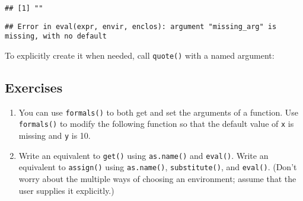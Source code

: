 \begin{verbatim}
## [1] ""
\end{verbatim}

\begin{Shaded}
\begin{Highlighting}[]
\StringTok{ }\OperatorTok{$}
\end{Highlighting}
\end{Shaded}

\begin{verbatim}
## Error in eval(expr, envir, enclos): argument "missing_arg" is missing, with no default
\end{verbatim}

To explicitly create it when needed, call \texttt{quote()} with a named
argument:

\begin{Shaded}
\begin{Highlighting}[]
\NormalTok{(}\NormalTok{)}
\end{Highlighting}
\end{Shaded}

\hypertarget{exercises-1}{%
\subsection{Exercises}\label{exercises-1}}

\begin{enumerate}
\def\labelenumi{\arabic{enumi}.}
\item
  You can use \texttt{formals()} to both get and set the arguments of a
  function. Use \texttt{formals()} to modify the following function so
  that the default value of \texttt{x} is missing and \texttt{y} is 10.

\begin{Shaded}
\begin{Highlighting}[]
\StringTok{ }\NormalTok{(} 
\OperatorTok{+}\StringTok{ }
\NormalTok{\}}
\end{Highlighting}
\end{Shaded}
\item
  Write an equivalent to \texttt{get()} using \texttt{as.name()} and
  \texttt{eval()}. Write an equivalent to \texttt{assign()} using
  \texttt{as.name()}, \texttt{substitute()}, and \texttt{eval()}. (Don't
  worry about the multiple ways of choosing an environment; assume that
  the user supplies it explicitly.)
\end{enumerate}

